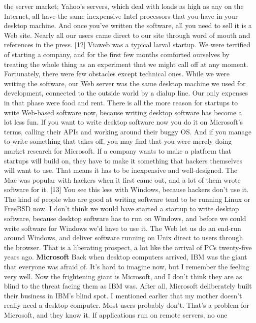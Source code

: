 the server market; Yahoo's servers, which deal with loads as high
as any on the Internet, all have the same inexpensive Intel processors
that you have in your desktop machine.  And once you've written
the software, all you need to sell it is a Web site.  Nearly all
our users came direct to our site through word of mouth and references
in the press. [12]
Viaweb was a typical larval startup.  We were terrified of starting
a company, and for the first few months comforted ourselves by
treating the whole thing as an experiment that we might call off
at any moment.  Fortunately, there were few obstacles except
technical ones.  While we were writing the software, our Web server
was the same desktop machine we used for development, connected to
the outside world by a dialup line.  Our only expenses in that
phase were food and rent.
There is all the more reason for startups to write Web-based software
now, because writing desktop software has become a lot less fun.
If you want to write desktop software now you do it on Microsoft's
terms, calling their APIs and working around their buggy OS.  And
if you manage to write something that takes off, you may find that
you were merely doing market research for Microsoft.
If a company wants to make a platform that startups will build on,
they have to make it something that hackers themselves will want
to use.   That means it has to be inexpensive and well-designed.
The Mac was popular with hackers when it first came out, and a lot
of them wrote software for it. [13] You see this less with Windows,
because hackers don't use it.  The kind of people who are good at
writing software tend to be running Linux or FreeBSD now.
I don't think we would have started a startup to write desktop
software, because desktop software has to run on Windows, and before
we could write software for Windows we'd have to use it.  The Web 
let us do an end-run around Windows, and deliver software running 
on Unix direct to users through the browser.  That is a liberating 
prospect, a lot like the arrival of PCs twenty-five years ago.
\textbf{Microsoft}
Back when desktop computers arrived, IBM was the giant that everyone
was afraid of.  It's hard to imagine now, but I remember the feeling
very well.  Now the frightening giant is Microsoft, and I don't
think they are as blind to the threat facing them as IBM was.
After all, Microsoft deliberately built their business in IBM's
blind spot.
I mentioned earlier that my mother doesn't really need a desktop
computer.  Most users probably don't.  That's a problem for Microsoft,
and they know it.  If applications run on remote servers, no one
